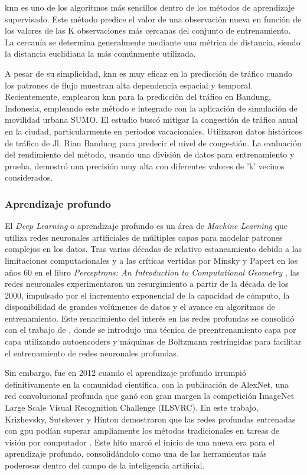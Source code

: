 \acrfull{knn} es uno de los algoritmos más sencillos dentro de los métodos de aprendizaje supervisado. Este método predice el valor de una observación nueva en función de los valores de las K observaciones más cercanas del conjunto de entrenamiento. La cercanía se determina generalmente mediante una métrica de distancia, siendo la distancia euclidiana la más comúnmente utilizada.

A pesar de su simplicidad, \acrshort{knn} es muy eficaz en la predicción de tráfico cuando los patrones de flujo muestran alta dependencia espacial y temporal. Recientemente, \cite{forecastKnn} emplearon \acrshort{knn} para la predicción del tráfico en Bandung, Indonesia, empleando este método e integrado con la aplicación de simulación de movilidad urbana SUMO. El estudio buscó mitigar la congestión de tráfico anual en la ciudad, particularmente en periodos vacacionales. Utilizaron datos históricos de tráfico de Jl. Riau Bandung para predecir el nivel de congestión. La evaluación del rendimiento del método, usando una división de datos para entrenamiento y prueba, demostró una precisión muy alta con diferentes valores de 'k' vecinos considerados.

\subsubsection*{Aprendizaje profundo}

El \textit{Deep Learning} o aprendizaje profundo es un área de \textit{Machine Learning} que utiliza redes neuronales artificiales de múltiples capas para modelar patrones complejos en los datos. Tras varias décadas de relativo estancamiento debido a las limitaciones computacionales y a las críticas vertidas por Minsky y Papert en los años 60 en el libro \textit{Perceptrons: An Introduction to Computational Geometry} \cite{minsky1969perceptrons}, las redes neuronales experimentaron un resurgimiento a partir de la década de los 2000, impulsado por el incremento exponencial de la capacidad de cómputo, la disponibilidad de grandes volúmenes de datos y el avance en algoritmos de entrenamiento. Este renacimiento del interés en las redes profundas se consolidó con el trabajo de \cite{hinton2006reducing}, donde se introdujo una técnica de preentrenamiento capa por capa utilizando autoencoders y máquinas de Boltzmann restringidas para facilitar el entrenamiento de redes neuronales profundas.

Sin embargo, fue en 2012 cuando el aprendizaje profundo irrumpió definitivamente en la comunidad científica, con la publicación de AlexNet, una red convolucional profunda que ganó con gran margen la competición ImageNet Large Scale Visual Recognition Challenge (ILSVRC). En este trabajo, Krizhevsky, Sutskever y Hinton demostraron que las redes profundas entrenadas con \acrlong{gpu} podían superar ampliamente los métodos tradicionales en tareas de visión por computador \cite{krizhevsky2012imagenet}. Este hito marcó el inicio de una nueva era para el aprendizaje profundo, consolidándolo como una de las herramientas más poderosas dentro del campo de la inteligencia artificial.

